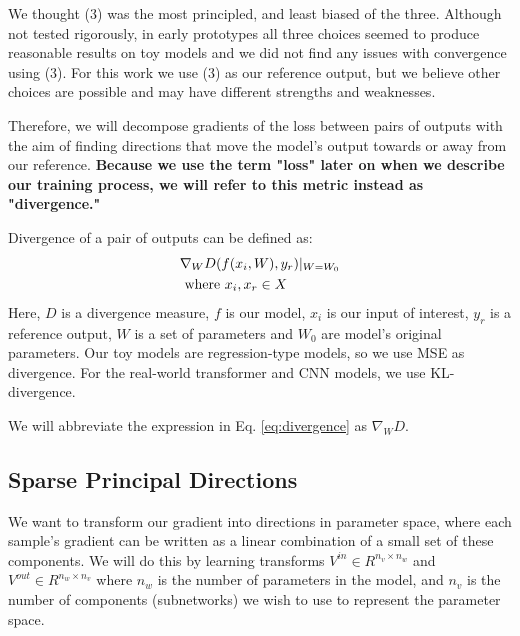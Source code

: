 \documentclass{article}
\theoremstyle{plain}
\theoremstyle{definition}
\theoremstyle{remark}
\begin{document}
We thought (3) was the most principled, and least biased of the three. Although not tested rigorously, in early prototypes all three choices seemed to produce reasonable results on toy models and we did not find any issues with convergence using (3). For this work we use (3) as our reference output, but we believe other choices are possible and may have different strengths and weaknesses.

Therefore, we will decompose gradients of the loss between pairs of outputs with the aim of finding directions that move the model's output towards or away from our reference. \textbf{Because we use the term "loss" later on when we describe our training process, we will refer to this metric instead as "divergence."}

Divergence of a pair of outputs can be defined as:
\begin{align}\label{eq:divergence}
    &\nabla_W D(f(x_i, W), y_r)|_{W=W_0} \\
    &\text{ where } x_i, x_r \in X \notag
\end{align}
Here, $D$ is a divergence measure, $f$ is our model, $x_i$ is our input of interest, $y_r$ is a reference output, $W$ is a set of parameters and $W_0$ are model's original parameters. Our toy models are regression-type models, so we use MSE as divergence. For the real-world transformer and CNN models, we use KL-divergence.

We will abbreviate the expression in Eq. \ref{eq:divergence} as $\nabla_W D$.

\subsection{Sparse Principal Directions}\label{subsec:decomposition}

We want to transform our gradient into directions in parameter space, where each sample's gradient can be written as a linear combination of a small set of these components. We will do this by learning transforms $V^{in} \in R^{n_v \times n_w}$ and $V^{out} \in R^{n_w \times n_v}$ where $n_w$ is the number of parameters in the model, and $n_v$ is the number of components (subnetworks) we wish to use to represent the parameter space.
\end{document}
